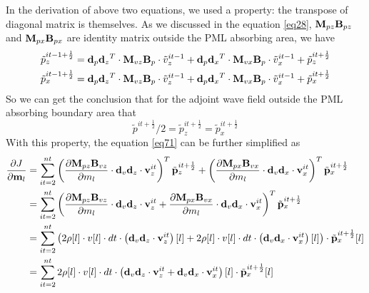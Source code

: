 \documentclass[revised,endfloat]{geophysics}
\begin{document}
In the derivation of above two equations, we used a property: the transpose of diagonal matrix is themselves. 
As we discussed in the equation \ref{eq28}, ${\bf M}_{pz}{\bf B}_{pz}$ and ${\bf M}_{px}{\bf B}_{px}$ are identity matrix outside the PML absorbing area, we have
\begin{equation}
\begin{split}
\tilde{p}_z^{it-1+\frac{1}{2}} = {{\bf d}_p{\bf d}_z}^T \cdot {{\bf M}_{vz}{\bf B}_{p}} \cdot \tilde{v}_z^{it-1} +  {{\bf d}_p{\bf d}_x}^T \cdot {{\bf M}_{vx}{\bf B}_{p}} \cdot \tilde{v}_x^{it-1} + \tilde{p}_z^{it+\frac{1}{2}} \\  
\tilde{p}_x^{it-1+\frac{1}{2}} = {{\bf d}_p{\bf d}_z}^T \cdot {{\bf M}_{vz}{\bf B}_{p}} \cdot \tilde{v}_z^{it-1}+  {{\bf d}_p{\bf d}_x}^T \cdot {{\bf M}_{vx}{\bf B}_{p}} \cdot \tilde{v}_x^{it-1} + \tilde{p}_x^{it+\frac{1}{2}} \\  
\end{split}
\label{eq75}
\end{equation}
So we can get the conclusion that for the adjoint wave field outside the PML absorbing boundary area that
\begin{equation}
\tilde{p}^{it+\frac{1}{2}}/2  = \tilde{p}_z^{it+\frac{1}{2}} = \tilde{p}_x^{it+\frac{1}{2}}
\label{eq76}
\end{equation}
With this property, the equation \ref{eq71} can be further simplified as
\begin{equation}
\begin{split}
\frac{\partial J}{{\partial \bf m}_l} &= \sum_{it=2}^{nt} \left( \frac{{\partial \bf M}_{pz}{\bf B}_{vz}}{\partial m_l} \cdot {\bf d}_v{\bf d}_z \cdot {\bf v}_z^{it} \right)^T \tilde{{\bf p}}_z^{it+\frac{1}{2}} +  \left( \frac{{\partial \bf M}_{px}{\bf B}_{vx}}{\partial m_l} \cdot {\bf d}_v{\bf d}_x \cdot {\bf v}_x^{it} \right)^T \tilde{{\bf p}}_x^{it+\frac{1}{2}} \\
&= \sum_{it=2}^{nt} \left( \frac{{\partial \bf M}_{pz}{\bf B}_{vz}}{\partial m_l} \cdot {\bf d}_v{\bf d}_z \cdot {\bf v}_z^{it} +  \frac{{\partial \bf M}_{px}{\bf B}_{vx}}{\partial m_l} \cdot {\bf d}_v{\bf d}_x \cdot {\bf v}_x^{it} \right)^T \tilde{{\bf p}}_x^{it+\frac{1}{2}}  \\
&=\sum_{it=2}^{nt} \left( 2\rho[l]\cdot v[l] \cdot dt \cdot \left( {\bf d}_v{\bf d}_z \cdot {\bf v}_z^{it}\right)[l] +  2\rho[l]\cdot v[l] \cdot dt \cdot \left( {\bf d}_v{\bf d}_x \cdot {\bf v}_x^{it} \right)[l] \right) \cdot \tilde{{\bf p}}_x^{it+\frac{1}{2}} [l]\\
&=\sum_{it=2}^{nt} 2\rho[l]\cdot v[l] \cdot dt \cdot \left( {\bf d}_v{\bf d}_z \cdot {\bf v}_z^{it}+  {\bf d}_v{\bf d}_x \cdot {\bf v}_x^{it} \right)[l] \cdot \tilde{{\bf p}}_x^{it+\frac{1}{2}} [l] \\
\end{split}
\label{eq77}
\end{equation}
\end{document}
